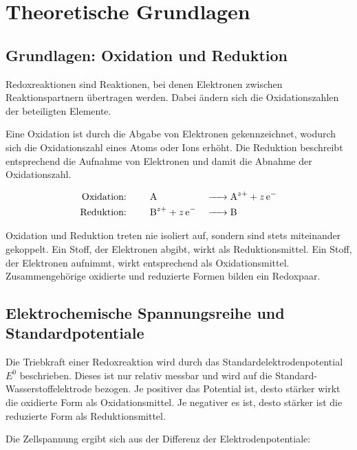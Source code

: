 \section{Theoretische Grundlagen}

\subsection{Grundlagen: Oxidation und Reduktion}

Redoxreaktionen sind Reaktionen, bei denen Elektronen zwischen Reaktionspartnern übertragen werden. Dabei ändern sich die Oxidationszahlen der beteiligten Elemente.

Eine Oxidation ist durch die Abgabe von Elektronen gekennzeichnet, wodurch sich die Oxidationszahl eines Atoms oder Ions erhöht. Die Reduktion beschreibt entsprechend die Aufnahme von Elektronen und damit die Abnahme der Oxidationszahl.

\begin{equation}
    \begin{aligned}
        \text{Oxidation: } \qquad & \ce{A              &  & -> A^{z+} + z e^-} \\
        \text{Reduktion: } \qquad & \ce{B^{z+} + z e^- &  & -> B}
        \label{eq:Redox}
    \end{aligned}
\end{equation}



Oxidation und Reduktion treten nie isoliert auf, sondern sind stets miteinander gekoppelt. Ein Stoff, der Elektronen abgibt, wirkt als Reduktionsmittel. Ein Stoff, der Elektronen aufnimmt, wirkt entsprechend als Oxidationsmittel. Zusammengehörige oxidierte und reduzierte Formen bilden ein Redoxpaar. \cite{mortimer_muller}

\subsection{Elektrochemische Spannungsreihe und Standardpotentiale}

Die Triebkraft einer Redoxreaktion wird durch das Standardelektrodenpotential $E^0$ beschrieben. Dieses ist nur relativ messbar und wird auf die Standard-Wasserstoffelektrode bezogen.
Je positiver das Potential ist, desto stärker wirkt die oxidierte Form als Oxidationsmittel. Je negativer es ist, desto stärker ist die reduzierte Form als Reduktionsmittel. \cite{skript}

Die Zellspannung ergibt sich aus der Differenz der Elektrodenpotentiale:

